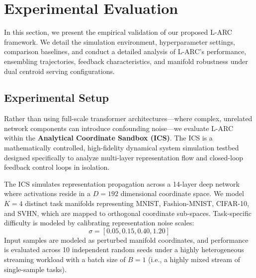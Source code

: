 \section{Experimental Evaluation}
\label{sec:experiments}

In this section, we present the empirical validation of our proposed L-ARC framework. We detail the simulation environment, hyperparameter settings, comparison baselines, and conduct a detailed analysis of L-ARC's performance, ensembling trajectories, feedback characteristics, and manifold robustness under dual centroid serving configurations.

\subsection{Experimental Setup}
Rather than using full-scale transformer architectures—where complex, unrelated network components can introduce confounding noise—we evaluate L-ARC within the \textbf{Analytical Coordinate Sandbox (ICS)}. The ICS is a mathematically controlled, high-fidelity dynamical system simulation testbed designed specifically to analyze multi-layer representation flow and closed-loop feedback control loops in isolation.

The ICS simulates representation propagation across a 14-layer deep network where activations reside in a $D=192$ dimensional coordinate space. We model $K=4$ distinct task manifolds representing MNIST, Fashion-MNIST, CIFAR-10, and SVHN, which are mapped to orthogonal coordinate sub-spaces. Task-specific difficulty is modeled by calibrating representation noise scales:
\begin{equation}
\sigma = [0.05, 0.15, 0.40, 1.20]
\label{eq:noise_scales}
\end{equation}
Input samples are modeled as perturbed manifold coordinates, and performance is evaluated across 10 independent random seeds under a highly heterogeneous streaming workload with a batch size of $B=1$ (i.e., a highly mixed stream of single-sample tasks).

